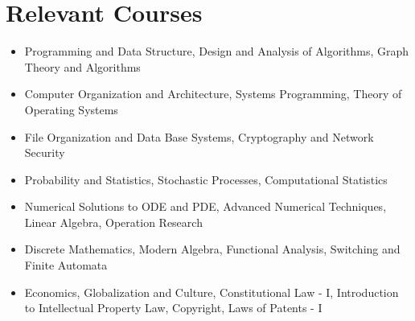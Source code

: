 \documentclass[a4paper,10pt]{article}
\begin{document}

\section{Relevant Courses}
\begin{itemize}
\item Programming and Data Structure, Design and Analysis of Algorithms, Graph Theory and Algorithms
\item Computer Organization and Architecture, Systems Programming, Theory of Operating Systems
\item File Organization and Data Base Systems, Cryptography and Network Security
\item Probability and Statistics, Stochastic Processes, Computational Statistics
\item Numerical Solutions to ODE and PDE, Advanced Numerical Techniques, Linear Algebra, Operation Research
\item Discrete Mathematics, Modern Algebra, Functional Analysis, Switching and Finite Automata
\item Economics, Globalization and Culture, Constitutional Law - I, Introduction to Intellectual Property Law, Copyright, Laws of Patents - I
\end{itemize}


\end{document}
